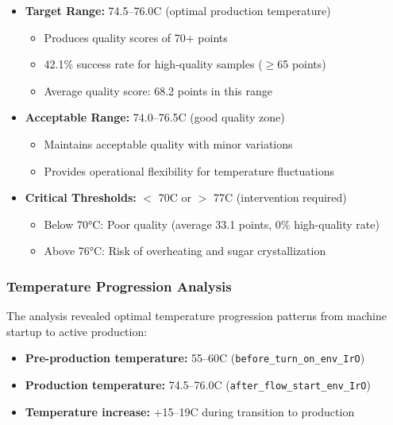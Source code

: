 \begin{itemize}
    \item \textbf{Target Range:} 74.5--76.0\textdegree C (optimal production temperature)
    \begin{itemize}
        \item Produces quality scores of 70+ points
    \item 42.1\% success rate for high-quality samples ($\geq$65 points)
        \item Average quality score: 68.2 points in this range
    \end{itemize}
    
    \item \textbf{Acceptable Range:} 74.0--76.5\textdegree C (good quality zone)
    \begin{itemize}
        \item Maintains acceptable quality with minor variations
        \item Provides operational flexibility for temperature fluctuations
    \end{itemize}
    
    \item \textbf{Critical Thresholds:} $<$ 70\textdegree C or $>$ 77\textdegree C (intervention required)
    \begin{itemize}
        \item Below 70°C: Poor quality (average 33.1 points, 0\% high-quality rate)
        \item Above 76°C: Risk of overheating and sugar crystallization
    \end{itemize}
\end{itemize}

\subsubsection{Temperature Progression Analysis}

The analysis revealed optimal temperature progression patterns from machine startup to active production:

\begin{itemize}
    \item \textbf{Pre-production temperature:} 55--60\textdegree C (\texttt{before\_turn\_on\_env\_IrO})
    \item \textbf{Production temperature:} 74.5--76.0\textdegree C (\texttt{after\_flow\_start\_env\_IrO})
    \item \textbf{Temperature increase:} +15--19\textdegree C during transition to production
\end{itemize}

